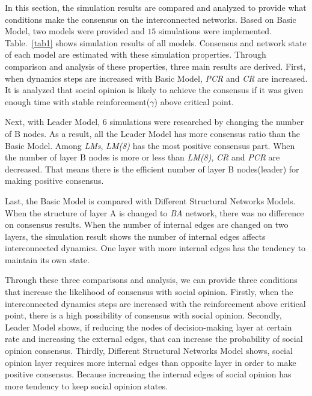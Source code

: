 \documentclass[english]{cccconf}
\begin{document}
In this section, the simulation results are compared and analyzed to provide what conditions make the consensus on the interconnected networks. Based on Basic Model, two models were provided and $15$ simulations were implemented. Table.~\ref{tab1} shows simulation results of all models. Consensus and network state of each model are estimated with these simulation properties. Through comparison and analysis of these properties, three main results are derived. 
First, when dynamics steps are increased with Basic Model, \textit{PCR} and \textit{CR} are increased. It is analyzed that social opinion is likely to achieve the consensus if it was given enough time with stable reinforcement($\gamma$) above critical point.

Next, with Leader Model, 6 simulations were researched by changing the number of B nodes. As a result, all the Leader Model has more consensus ratio than the Basic Model. Among \textit{LMs}, \textit{LM(8)} has the most positive consensus part. When the number of layer B nodes is more or less than \textit{LM(8)}, \textit{CR} and \textit{PCR} are decreased. That means there is the efficient number of layer B nodes(leader) for making positive consensus.  

Last, the Basic Model is compared with Different Structural Networks Models. When the structure of layer A is changed to \textit{BA} network, there was no difference on consensus results. When the number of internal edges are changed on two layers, the simulation result shows the number of internal edges affects interconnected dynamics. One layer with more internal edges has the tendency to maintain its own state.

Through these three comparisons and analysis, we can provide three conditions that increase the likelihood of consensus with social opinion. Firstly, when the interconnected dynamics steps are increased with the reinforcement above critical point, there is a high possibility of consensus with social opinion. Secondly, Leader Model shows, if reducing the nodes of decision-making layer at certain rate and increasing the external edges, that can increase the probability of social opinion consensus. Thirdly, Different Structural Networks Model shows, social opinion layer requires more internal edges than opposite layer in order to make positive consensus. Because increasing the internal edges of social opinion has more tendency to keep social opinion states. 
\end{document}
